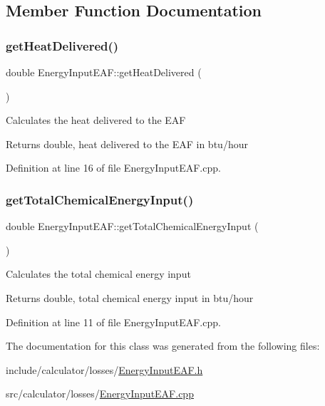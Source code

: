 \subsection{Member Function Documentation}
\mbox{\label{class_energy_input_e_a_f_ad1916eba02c6036a603cf34420169911}} 
\subsubsection{\texorpdfstring{get\+Heat\+Delivered()}{getHeatDelivered()}}
{\footnotesize\ttfamily double Energy\+Input\+E\+A\+F\+::get\+Heat\+Delivered (\begin{DoxyParamCaption}{ }\end{DoxyParamCaption})}

Calculates the heat delivered to the E\+AF

\begin{DoxyReturn}{Returns}
double, heat delivered to the E\+AF in btu/hour 
\end{DoxyReturn}


Definition at line 16 of file Energy\+Input\+E\+A\+F.\+cpp.

\mbox{\label{class_energy_input_e_a_f_a44b4a70dcc3e5f0bf9d33eabd6158b2f}} 
\subsubsection{\texorpdfstring{get\+Total\+Chemical\+Energy\+Input()}{getTotalChemicalEnergyInput()}}
{\footnotesize\ttfamily double Energy\+Input\+E\+A\+F\+::get\+Total\+Chemical\+Energy\+Input (\begin{DoxyParamCaption}{ }\end{DoxyParamCaption})}

Calculates the total chemical energy input

\begin{DoxyReturn}{Returns}
double, total chemical energy input in btu/hour 
\end{DoxyReturn}


Definition at line 11 of file Energy\+Input\+E\+A\+F.\+cpp.



The documentation for this class was generated from the following files\+:\begin{DoxyCompactItemize}
\item 
include/calculator/losses/\hyperlink{_energy_input_e_a_f_8h}{Energy\+Input\+E\+A\+F.\+h}\item 
src/calculator/losses/\hyperlink{_energy_input_e_a_f_8cpp}{Energy\+Input\+E\+A\+F.\+cpp}\end{DoxyCompactItemize}

